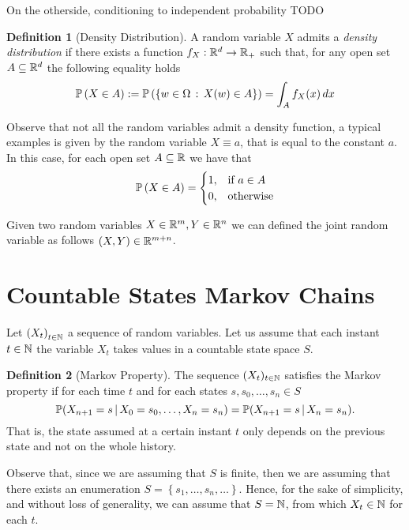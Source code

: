 \documentclass{report}
\theoremstyle{definition}
\newtheorem{defn}{Definition}
\begin{document}
On the otherside, conditioning to independent probability TODO

\begin{defn}[Density Distribution]
  A random variable $X$ admits a \textit{density distribution} if there
  exists a function $f_X:\mathbb{R}^d\to\mathbb{R}_+$ such that, for any open set
  $A\subseteq\mathbb{R}^d$ the
  following equality holds
  \begin{equation}
    \mathbb{P}\left( X\in A \right) := \mathbb{P}\left( \left\{ w\in\Omega\,:\,X(w)\in A \right\} \right)= \int_A f_X(x)\,dx
    \label{eq:density}
  \end{equation}
\end{defn}
Observe that not all the random variables admit a density function, a
typical examples is given by the random variable $X\equiv a$, that is equal to the
constant $a$. In this case, for each open set $A\subseteq \mathbb{R}$ we have that
\begin{equation}
  \mathbb{P}\left( X\in A \right)=
  \begin{cases}
    1, &\mbox{if } a\in A\\
    0, &\mbox{otherwise}
  \end{cases}
  \label{eq:not_f}
\end{equation}


Given two random variables $X\in\mathbb{R}^m,Y\in\mathbb{R}^n$ we can defined the
joint random variable as follows $(X,Y)\in\mathbb{R}^{m+n}$.
\section{Countable States Markov Chains}
Let $\left( X_t \right)_{t\in\mathbb{N}}$ a sequence of random variables. Let us
assume that each instant $t\in\mathbb{N}$ the variable $X_t$ takes values in a countable state space $S$. 
\begin{defn}[Markov Property]
The sequence $(X_t)_{t\in\mathbb{N}}$ satisfies the Markov property if for each time
$t$ and for each states $s,s_0,\dots,s_n\in S$
\begin{equation}
  \mathbb{P}(X_{n+1}=s\,\vert\,
  X_0=s_0,\dots,X_n=s_n)=\mathbb{P}(X_{n+1}=s\,\vert\, X_n=s_n).
  \label{eq:markov-property}
\end{equation}
That is, the state assumed at a certain instant $t$ only depends on the
previous state and not on the whole history.
\end{defn}

Observe that, since we are assuming that $S$ is finite, then we are assuming
that there exists an enumeration $S=\left\{ s_1,\dots,s_n,\dots \right\}$.
Hence,  for the sake of simplicity, and without loss of generality, we can
assume that $S=\mathbb{N}$, from which $X_t\in\mathbb{N}$ for each $t$.
\end{document}
